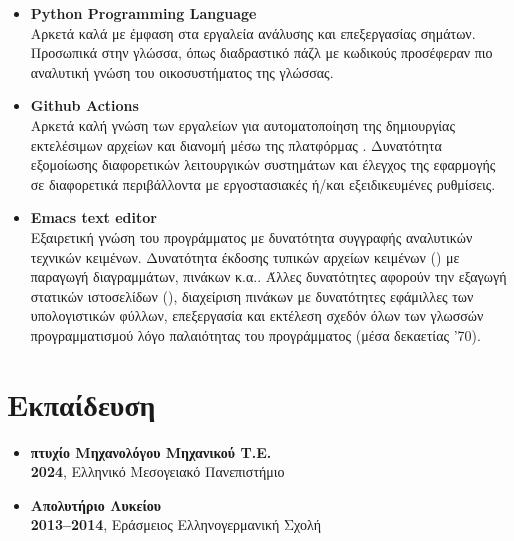 \documentclass[a4paper,9pt]{extarticle}
\begin{document}
\begin{itemize}
\item{\textbf{Python Programming Language}} \\
        Αρκετά καλά με έμφαση στα εργαλεία ανάλυσης και επεξεργασίας σημάτων. Προσωπικά 
        στην γλώσσα, όπως διαδραστικό πάζλ με κωδικούς  προσέφεραν πιο
        αναλυτική γνώση του οικοσυστήματος της γλώσσας. \\

\item{\textbf{Github Actions}} \\
        \noindent
        Αρκετά καλή γνώση των εργαλείων για αυτοματοποίηση της δημιουργίας εκτελέσιμων
        αρχείων και διανομή μέσω της πλατφόρμας .
        Δυνατότητα εξομοίωσης διαφορετικών λειτουργικών συστημάτων και έλεγχος
        της εφαρμογής σε διαφορετικά περιβάλλοντα με εργοστασιακές ή/και
        εξειδικευμένες ρυθμίσεις. \\

\item{\textbf{Emacs text editor}} \\
        \noindent
        Εξαιρετική γνώση του προγράμματος με δυνατότητα συγγραφής αναλυτικών
        τεχνικών κειμένων. Δυνατότητα έκδοσης τυπικών αρχείων κειμένων ()
        με παραγωγή διαγραμμάτων, πινάκων κ.α.. Άλλες δυνατότητες αφορούν την
        εξαγωγή στατικών ιστοσελίδων (), διαχείριση πινάκων με δυνατότητες
        εφάμιλλες των υπολογιστικών φύλλων, επεξεργασία και εκτέλεση σχεδόν όλων των
        γλωσσών προγραμματισμού λόγο παλαιότητας του προγράμματος (μέσα δεκαετίας '70).\\
\end{itemize}



\section*{Εκπαίδευση}

\noindent
\begin{itemize}
  \item{\textbf{πτυχίο Μηχανολόγου Μηχανικού Τ.Ε.}} \\
        \textbf{2024}, Ελληνικό Μεσογειακό Πανεπιστήμιο \\
\noindent
  \item{\textbf{Απολυτήριο Λυκείου}} \\
        \textbf{2013--2014}, Εράσμειος Ελληνογερμανική Σχολή \\
\end{itemize}
\end{document}
